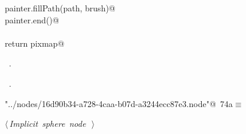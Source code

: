 \documentclass[
    a4paper,      %
    10pt,         %
    openright,    %
    notitlepage,  %
    parskip=half, %
]{scrreprt}       %
\theoremstyle{definition}                    %
\begin{document}
\begin{flushleft}
\begin{minipage}{\linewidth}
\begin{list}{}{}
\mbox{}\lstinline@    painter.fillPath(path, brush)@\\
\mbox{}\lstinline@    painter.end()@\\
\mbox{}\lstinline@@\\
\mbox{}\lstinline@    return pixmap@\\
\mbox{}\lstinline@@{\NWsep}
\end{list}
\vspace{-1.5ex}
\footnotesize
\begin{list}{}{\setlength{\itemsep}{-\parsep}\setlength{\itemindent}{-\leftmargin}}
\item \NWtxtMacroDefBy\ .
\item \NWtxtMacroRefIn\ .

\item{}
\end{list}
\end{minipage}\vspace{4ex}
\end{flushleft}
\begin{flushleft} \small
\begin{minipage}{\linewidth}\label{scrap127}\raggedright\small
{} \verb@"../nodes/16d90b34-a728-4caa-b07d-a3244ecc87e3.node"@\nobreak\ {\footnotesize {74a}}$\equiv$
\vspace{-1ex}
\begin{list}{}{} \item
\mbox{}\lstinline@@\hbox{$\langle\,${\itshape Implicit sphere node}\nobreak\ {\footnotesize {}}$\,\rangle$}\lstinline@@{\NWsep}
\end{list}
\vspace{-1.5ex}
\footnotesize
\begin{list}{}{\setlength{\itemsep}{-\parsep}\setlength{\itemindent}{-\leftmargin}}

\item{}
\end{list}
\end{minipage}\vspace{4ex}
\end{flushleft}
\end{document}
